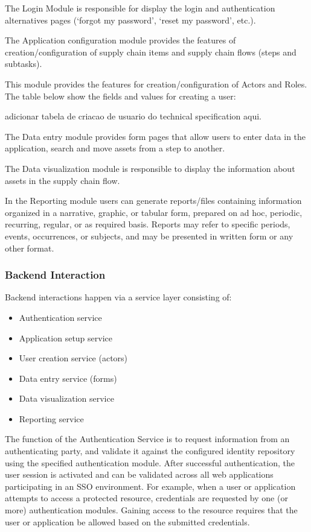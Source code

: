 The Login Module is responsible for display the login and authentication alternatives pages (‘forgot my password’, ‘reset my password’, etc.).

The Application configuration module provides the features of creation/configuration of supply chain items and supply chain flows (steps and subtasks).

This module provides the features for creation/configuration of Actors and Roles. The table below show the fields and values for creating a user:

{\color{red}adicionar tabela de criacao de usuario do technical specification aqui.}

The Data entry module provides form pages that allow users to enter data in the application, search and move assets from a step to another.

The Data visualization module is responsible to display the information about assets in the supply chain flow. 

In the Reporting module users can generate reports/files containing information organized in a narrative, graphic, or tabular form, prepared on ad hoc, periodic, recurring, regular, or as required basis. Reports may refer to specific periods, events, occurrences, or subjects, and may be presented in written form or any other format.

\subsubsection{Backend Interaction}\label{sec:BackendInteraction}
Backend interactions happen via a service layer consisting of:

\begin{itemize}
\item Authentication service
\item Application setup service
\item User creation service (actors)
\item Data entry service (forms)
\item Data visualization service
\item Reporting service
\end{itemize}

The function of the Authentication Service is to request information from an authenticating party, and validate it against the configured identity repository using the specified authentication module. After successful authentication, the user session is activated and can be validated across all web applications participating in an SSO environment. For example, when a user or application attempts to access a protected resource, credentials are requested by one (or more) authentication modules. Gaining access to the resource requires that the user or application be allowed based on the submitted credentials.

